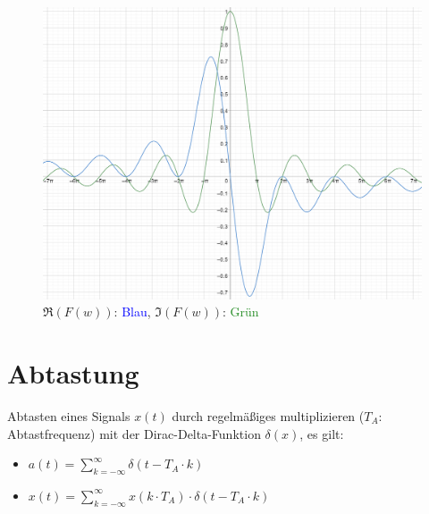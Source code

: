 \documentclass[12pt,a4paper]{article}
\newcommand{\blue}[1]{\textcolor{blue} {#1}}
\newcommand{\green}[1]{\textcolor{ForestGreen} {#1}}
\begin{document}
\begin{figure}[H]
\centering
\includegraphics[scale=0.2]{./resources/ft_res.png}
\caption{$\Re(F(w))$: \blue{Blau}, $\Im(F(w))$: \green{Grün}}
\end{figure}

\section{Abtastung}
Abtasten eines Signals $x(t)$ durch regelmäßiges multiplizieren ($T_A$: Abtastfrequenz) mit der Dirac-Delta-Funktion $\delta(x)$, es gilt:
\begin{itemize}
\item $\displaystyle a(t) = \sum_{k=-\infty}^\infty \delta(t-T_A\cdot k)$
\item $\displaystyle x(t) = \sum_{k=-\infty}^\infty x(k\cdot T_A)\cdot \delta(t-T_A\cdot k)$
\end{itemize}
\end{document}

